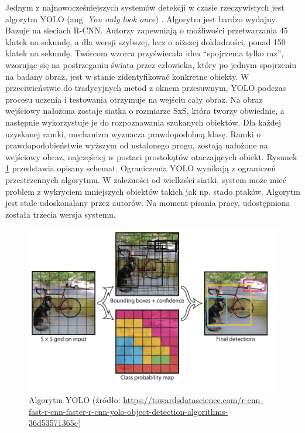 Jednym z najnowocześniejszych systemów detekcji w czasie rzeczywistych jest algorytm YOLO (ang. \textit{You only look once}) \cite{7780460}.
Algorytm jest bardzo wydajny.
Bazuje na sieciach R-CNN.
Autorzy zapewniają o możliwości przetwarzania 45 klatek na sekundę, a dla wersji szybszej, lecz o niższej dokładności, ponad 150 klatek na sekundę.
Twórcom wzorca przyświecała idea ``spojrzenia tylko raz'', wzorując się na postrzeganiu świata przez człowieka, który po jednym spojrzeniu na badany obraz, jest w stanie zidentyfikować konkretne obiekty.
W przeciwieństwie do tradycyjnych metod z oknem przesuwnym, YOLO podczas procesu uczenia i testowania otrzymuje na wejściu cały obraz.
Na obraz wejściowy nałożona zostaje siatka o rozmiarze SxS, która tworzy obwiednie, a następnie wykorzystuje je do rozpoznawania szukanych obiektów.
Dla każdej uzyskanej ramki, mechanizm wyznacza prawdopodobną klasę.
Ramki o prawdopodobieństwie wyższym od ustalonego progu, zostają nałożone na wejściowy obraz, najczęściej w postaci prostokątów otaczających obiekt.
Rysunek \ref{fig:yolo} przedstawia opisany schemat.
Ograniczenia YOLO wynikają z ograniczeń przestrzennych algorytmu.
W zależności od wielkości siatki, system może mieć problem z wykryciem mniejszych obiektów takich jak np. stado ptaków.
Algorytm jest stale udoskonalany przez autorów.
Na moment pisania pracy, udostępniona została trzecia wersja systemu.
\begin{figure}[!ht]
    \centering
    \includegraphics[scale=0.4]{Pictures/yolo}
    \caption{Algorytm YOLO (źródło: \url{https://towardsdatascience.com/r-cnn-fast-r-cnn-faster-r-cnn-yolo-object-detection-algorithms-36d53571365e})}
    \label{fig:yolo}
\end{figure}
\FloatBarrier


